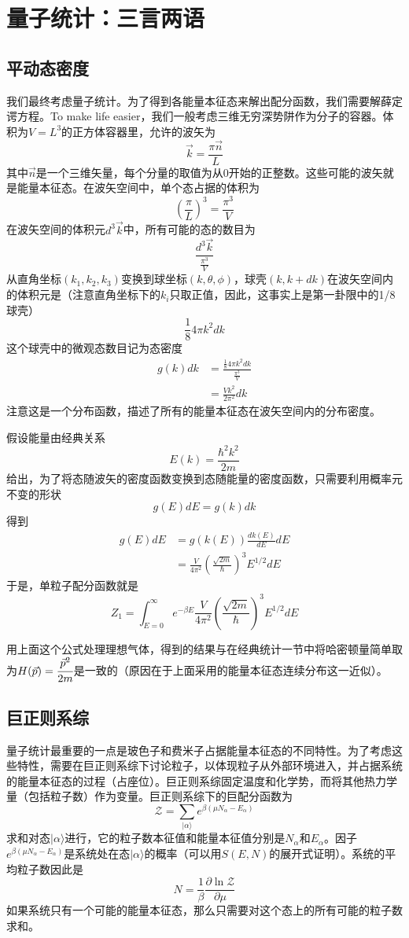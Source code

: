 \documentclass[a4paper,11pt]{ctexart}
\newcommand{\beq}{\begin{equation}}
\newcommand{\eeq}{\end{equation}}
\newcommand{\bea}{\begin{equation}\begin{aligned}}
\newcommand{\eea}{\end{aligned}\end{equation}}
\newcommand{\red}{\color{red}}
\newcommand{\grandz}{\mathcal{Z}}
\begin{document}
\section{量子统计：三言两语}
\subsection{平动态密度}
我们最终考虑量子统计。为了得到各能量本征态来解出配分函数，我们需要解薛定谔方程。To make life easier，我们一般考虑三维无穷深势阱作为分子的容器。体积为$V = L^3$的正方体容器里，允许的波矢为
\beq
\vec{k} = \frac{\pi \vec{n}}{L}
\eeq
其中$\vec{n}$是一个三维矢量，每个分量的取值为从0开始的正整数。这些可能的波矢就是能量本征态。在波矢空间中，单个态占据的体积为
\beq
(\frac{\pi}{L})^3 = \frac{\pi^3}{V}
\eeq
在波矢空间的体积元$d^3\vec{k}$中，所有可能的态的数目为
\beq
\frac{d^3\vec{k}}{\frac{\pi^3}{V}}
\eeq
从直角坐标$(k_1,k_2,k_3)$变换到球坐标$(k,\theta,\phi)$，球壳$(k,k+dk)$在波矢空间内的体积元是（注意直角坐标下的$k_i$只取正值，因此，这事实上是第一卦限中的1/8球壳）
\beq
\frac{1}{8} 4\pi k^2 dk
\eeq
这个球壳中的微观态数目记为{\red 态密度}
\bea
g(k)dk &= \frac{\frac{1}{8} 4\pi k^2 dk}{\frac{\pi^3}{V}} \\
&= \frac{Vk^2}{2\pi^2}dk
\eea
注意这是一个分布函数，描述了所有的能量本征态在波矢空间内的分布密度。
\par
假设能量由经典关系
\beq
E(k) = \frac{\hbar^2 k^2}{2m}
\eeq
给出，为了将态随波矢的密度函数变换到态随能量的密度函数，只需要利用概率元不变的形状
\beq
g(E)dE = g(k) dk
\eeq
得到
\bea
g(E)dE &= g(k(E)) \frac{dk(E)}{dE} dE \\
&= \frac{V}{4\pi^2} (\frac{\sqrt{2m}}{\hbar})^3 E^{1/2} dE
\eea
于是，单粒子配分函数就是
\beq
Z_1 = \int_{E=0}^\infty e^{-\beta E}\frac{V}{4\pi^2} (\frac{\sqrt{2m}}{\hbar})^3 E^{1/2} dE
\eeq
\par
用上面这个公式处理理想气体，得到的结果与在经典统计一节中将哈密顿量简单取为$H(\vec{p})= \cfrac{\vec{p}^2}{2m}$是一致的（原因在于上面采用的能量本征态连续分布这一近似）。
\subsection{巨正则系综}
量子统计最重要的一点是玻色子和费米子占据能量本征态的不同特性。为了考虑这些特性，需要在巨正则系综下讨论粒子，以体现粒子从外部环境进入，并占据系统的能量本征态的过程（占座位）。巨正则系综固定温度和化学势，而将其他热力学量（包括粒子数）作为变量。巨正则系综下的巨配分函数为
\beq
\grandz = \sum_{|\alpha \rangle}e^{\beta(\mu N_\alpha - E_\alpha)}
\eeq
求和对态$|\alpha \rangle$进行，它的粒子数本征值和能量本征值分别是$N_\alpha$和$E_\alpha$。因子$e^{\beta(\mu N_\alpha - E_\alpha)}$是系统处在态$|\alpha \rangle$的概率（可以用$S(E,N)$的展开式证明）。系统的平均粒子数因此是
\beq
N = \frac{1}{\beta} \frac{\partial \ln \grandz}{\partial \mu}
\eeq
如果系统只有一个可能的能量本征态，那么只需要对这个态上的所有可能的粒子数求和。
\end{document}
